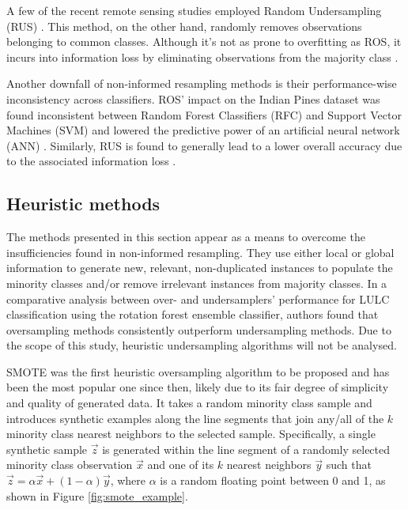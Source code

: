 \documentclass[parskip=full]{scrartcl}
\begin{document}
A few of the recent remote sensing studies employed Random Undersampling (RUS)
\cite{Ferreira2019}. This method, on the other hand, randomly removes
observations belonging to common classes. Although it's not as prone to
overfitting as ROS, it incurs into information loss by eliminating observations
from the majority class \cite{Feng2019}.

Another downfall of non-informed resampling methods is their performance-wise
inconsistency across classifiers. ROS' impact on the Indian Pines dataset was
found inconsistent between Random Forest Classifiers (RFC) and Support Vector
Machines (SVM) and lowered the predictive power of an artificial neural network
(ANN) \cite{Maxwell2018}. Similarly, RUS is found to generally lead to a
lower overall accuracy due to the associated information loss
\cite{Maxwell2018}.

\subsection{Heuristic methods}

The methods presented in this section appear as a means to overcome the
insufficiencies found in non-informed resampling. They use either local or
global information to generate new, relevant, non-duplicated instances to
populate the minority classes and/or remove irrelevant instances from majority
classes. In a comparative analysis between over- and undersamplers' performance
for LULC classification \cite{Feng2018} using the rotation forest
ensemble classifier, authors found that oversampling methods consistently
outperform undersampling methods. Due to the scope of this study, heuristic
undersampling algorithms will not be analysed.

SMOTE \cite{Chawla2002} was the first heuristic oversampling algorithm to
be proposed and has been the most popular one since then, likely due to its
fair degree of simplicity and quality of generated data. It takes a random
minority class sample and introduces synthetic examples along the line segments
that join any/all of the $k$ minority class nearest
neighbors to the selected sample. Specifically, a single synthetic sample
$\overrightarrow{z}$ is generated within the line segment of a randomly
selected minority class observation $\overrightarrow{x}$ and one of its
$k$ nearest neighbors $\overrightarrow{y}$ such that
$\overrightarrow{z} =
	\alpha\overrightarrow{x}+(1-\alpha)\overrightarrow{y}$, where $\alpha$ is a random floating point
between 0 and 1, as shown in Figure \ref{fig:smote_example}.
\end{document}

